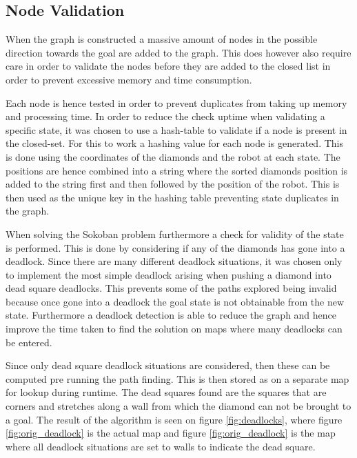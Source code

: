 \subsection{Node Validation}
When the graph is constructed a massive amount of nodes in the possible direction towards the goal are added to the graph.
This does however also require care in order to validate the nodes before they are added to the closed list in order to prevent excessive memory and time consumption.

Each node is hence tested in order to prevent duplicates from taking up memory and processing time.
In order to reduce the check uptime when validating a specific state, it was chosen to use a hash-table to validate if a node is present in the closed-set.
For this to work a hashing value for each node is generated.
This is done using the coordinates of the diamonds and the robot at each state.
The positions are hence combined into a string where the sorted diamonds position is added to the string first and then followed by the position of the robot.
This is then used as the unique key in the hashing table preventing state duplicates in the graph.

When solving the Sokoban problem furthermore a check for validity of the state is performed.
This is done by considering if any of the diamonds has gone into a deadlock.
Since there are many different deadlock situations, it was chosen only to implement the most simple deadlock arising when pushing a diamond into dead square deadlocks.
This prevents some of the paths explored being invalid because once gone into a deadlock the goal state is not obtainable from the new state.
Furthermore a deadlock detection is able to reduce the graph and hence improve the time taken to find the solution on maps where many deadlocks can be entered.

Since only dead square deadlock situations are considered, then these can be computed pre running the path finding.
This is then stored as on a separate map for lookup during runtime.
The dead squares found are the squares that are corners and stretches along a wall from which the diamond can not be brought to a goal.
The result of the algorithm is seen on figure \ref{fig:deadlocks}, where figure \ref{fig:orig_deadlock} is the actual map and figure \ref{fig:orig_deadlock} is the map where all deadlock situations are set to walls to indicate the dead square.


